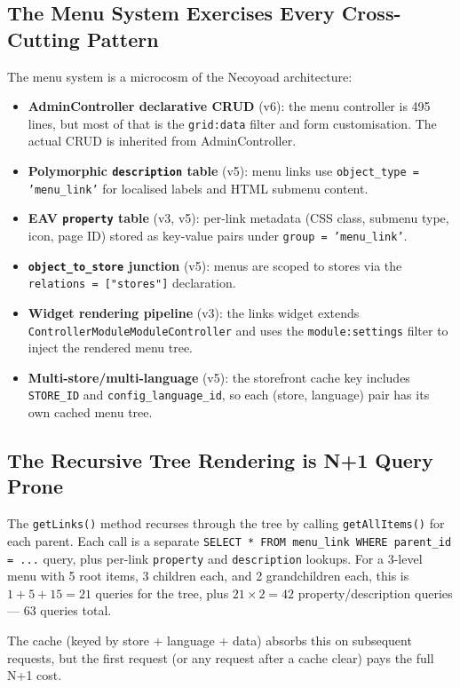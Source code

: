 \documentclass[11pt,a4paper]{article}
\begin{document}
\subsection{The Menu System Exercises Every Cross-Cutting Pattern}

The menu system is a microcosm of the Necoyoad architecture:

\begin{itemize}[leftmargin=1.6em,itemsep=2pt]
  \item \textbf{AdminController declarative CRUD} (v6): the menu
        controller is 495 lines, but most of that is the
        \texttt{grid:data} filter and form customisation. The actual
        CRUD is inherited from AdminController.
  \item \textbf{Polymorphic \texttt{description} table} (v5):
        menu links use \texttt{object\_type = 'menu\_link'} for
        localised labels and HTML submenu content.
  \item \textbf{EAV \texttt{property} table} (v3, v5): per-link
        metadata (CSS class, submenu type, icon, page ID) stored as
        key-value pairs under \texttt{group = 'menu\_link'}.
  \item \textbf{\texttt{object\_to\_store} junction} (v5): menus are
        scoped to stores via the \texttt{relations = ["stores"]}
        declaration.
  \item \textbf{Widget rendering pipeline} (v3): the links widget
        extends \texttt{ControllerModuleModuleController} and uses
        the \texttt{module:settings} filter to inject the rendered
        menu tree.
  \item \textbf{Multi-store/multi-language} (v5): the storefront
        cache key includes \texttt{STORE\_ID} and
        \texttt{config\_language\_id}, so each (store, language)
        pair has its own cached menu tree.
\end{itemize}

\subsection{The Recursive Tree Rendering is N+1 Query Prone}

\begin{findingbox}
The \texttt{getLinks()} method recurses through the tree by calling
\texttt{getAllItems()} for each parent. Each call is a separate
\texttt{SELECT * FROM menu\_link WHERE parent\_id = ...} query,
plus per-link \texttt{property} and \texttt{description} lookups.
For a 3-level menu with 5 root items, 3 children each, and 2
grandchildren each, this is $1 + 5 + 15 = 21$ queries for the
tree, plus $21 \times 2 = 42$ property/description queries --- 63
queries total.

The cache (keyed by store + language + data) absorbs this on
subsequent requests, but the first request (or any request after
a cache clear) pays the full N+1 cost.
\end{findingbox}
\end{document}
